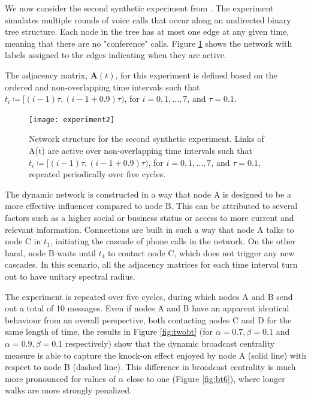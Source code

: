 \newpage
We now consider the second synthetic experiment from \cite{grindrod2014dynamical}. The experiment simulates multiple rounds of voice calls that occur along an undirected binary tree structure. Each node in the tree has at most one edge at any given time, meaning that there are no "conference" calls.  Figure \ref{fig:exp2} shows the network with labels assigned to the edges indicating when they are active. 

The adjacency matrix, $\mathbf{A}(t)$, for this experiment is defined based on the ordered and non-overlapping time intervals such that $t_i\coloneqq[(i − 1)\tau , (i − 1 + 0.9)\tau )$, for $i=0, 1, \dots , 7$, and $\tau =0.1$.

\begin{figure}[h]\centering
    \texttt{[image: experiment2]}
    \caption{Network structure for the second synthetic experiment. Links of A(t) are active over non-overlapping time intervals such that $t_i\coloneqq[(i − 1)\tau , (i − 1 + 0.9)\tau )$, for $i=0, 1, \dots , 7$, and $\tau =0.1$, repeated periodically over five cycles.}
    \label{fig:exp2}
    \bigskip
\end{figure}

The dynamic network is constructed in a way that node A is designed to be a more effective influencer compared to node B. This can be attributed to several factors such as a higher social or business status or access to more current and relevant information. Connections are built in such a way that node A talks to node C in $t_1$, initiating the cascade of phone calls in the network. On the other hand, node B waits until $t_4$ to contact node C, which does not trigger any new cascades. In this scenario, all the adjacency matrices for each time interval turn out to have unitary spectral radius.

The experiment is repeated over five cycles, during which nodes A and B send out a total of 10 messages. Even if nodes A and B have an apparent identical behaviour from an overall perspective, both contacting nodes C and D for the same length of time, the results in Figure \ref{fig:twobt} (for $\alpha = 0.7, \beta = 0.1$ and $\alpha = 0.9 , \beta = 0.1$ respectively) show that the dynamic broadcast centrality measure is able to capture the knock-on effect enjoyed by node A (solid line) with respect to node B (dashed line). This difference in broadcast centrality is much more pronounced for values of $\alpha$ close to one (Figure \ref{fig:bt6}), where longer walks are more strongly penalized.


